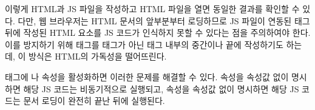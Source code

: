 이렇게 HTML과 JS 파일을 작성하고 HTML 파일을 열면 \과 동일한 결과를 확인할 수 있다. 다만, 웹 브라우저는 HTML 문서의 앞부분부터 로딩하므로 JS 파일이 연동된  태그 뒤에 작성된 HTML 요소를 JS 코드가 인식하지 못할 수 있다는 점을 주의하여야 한다. 이를 방지하기 위해  태그를  태그가 아닌  태그 내부의 중간이나 끝에 작성하기도 하는데, 이 방식은 HTML의 가독성을 떨어뜨린다.

 태그에 나  속성을 활성화하면 이러한 문제를 해결할 수 있다.  속성을 속성값 없이 명시하면 해당 JS 코드는 비동기적으로 실행되고,  속성을 속성값 없이 명시하면 해당 JS 코드는 문서 로딩이 완전히 끝난 뒤에 실행된다.
